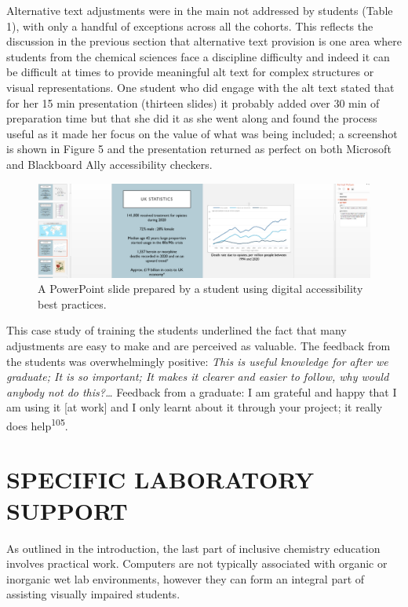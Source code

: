 \documentclass[11.5pt]{sig-alternate} %
\begin{document}
\begin{large}
Alternative text adjustments were in the main not addressed by students (Table 1), with only a handful of exceptions across all the cohorts. This reflects the discussion in the previous section that alternative text provision is one area where students from the chemical sciences face a discipline difficulty and indeed it can be difficult at times to provide meaningful alt text for complex structures or visual representations.  One student who did engage with the alt text stated that for her 15 min presentation (thirteen slides) it probably added over 30 min of preparation time but that she did it as she went along and found the process useful as it made her focus on the value of what was being included; a screenshot is shown in Figure 5 and the presentation returned as perfect on both Microsoft and Blackboard Ally accessibility checkers.

\begin{figure}[htb]
    \centering
    \includegraphics[width=\textwidth]{images/fig5.png}
    \caption{A PowerPoint slide prepared by a student using digital accessibility best practices.}
    \label{Figure 5}
\end{figure}

This case study of training the students underlined the fact that many adjustments are easy to make and are perceived as valuable. The feedback from the students was overwhelmingly positive: \textit{This is useful knowledge for after we graduate; It is so important; It makes it clearer and easier to follow, why would anybody not do this?…} Feedback from a graduate:  I am grateful and happy that I am using it [at work] and I only learnt about it through your project; it really does help\textsuperscript{105}.

\section*{SPECIFIC LABORATORY SUPPORT}

As outlined in the introduction, the last part of inclusive chemistry education involves practical work. Computers are not typically associated with organic or inorganic wet lab environments, however they can form an integral part of assisting visually impaired students. 


\end{large}
\end{document}
